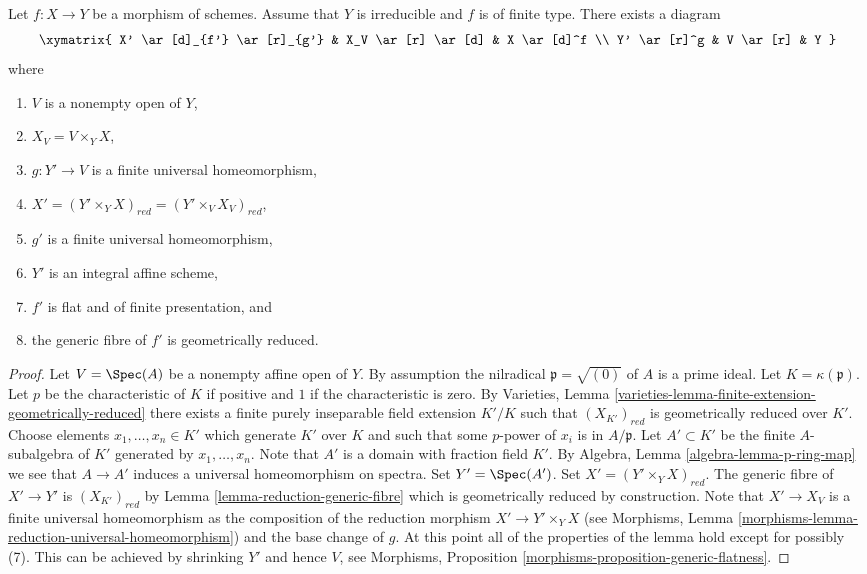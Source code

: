 \begin{lemma}
\label{lemma-make-generic-fibre-geometrically-reduced}
Let $f : X \to Y$ be a morphism of schemes.
Assume that $Y$ is irreducible and $f$ is of finite type.
There exists a diagram
$$
\xymatrix{
X' \ar[d]_{f'} \ar[r]_{g'} & X_V \ar[r] \ar[d] & X \ar[d]^f \\
Y' \ar[r]^g & V \ar[r] & Y
}
$$
where
\begin{enumerate}
\item $V$ is a nonempty open of $Y$,
\item $X_V = V \times_Y X$,
\item $g : Y' \to V$ is a finite universal homeomorphism,
\item $X' = (Y' \times_Y X)_{red} = (Y' \times_V X_V)_{red}$,
\item $g'$ is a finite universal homeomorphism,
\item $Y'$ is an integral affine scheme,
\item $f'$ is flat and of finite presentation, and
\item the generic fibre of $f'$ is geometrically reduced.
\end{enumerate}
\end{lemma}

\begin{proof}
Let $V = \Spec(A)$ be a nonempty affine open of $Y$.
By assumption the nilradical $\mathfrak p = \sqrt{(0)}$ of $A$
is a prime ideal.
Let $K = \kappa(\mathfrak p)$.
Let $p$ be the characteristic of $K$ if positive and $1$
if the characteristic is zero. By
Varieties, Lemma \ref{varieties-lemma-finite-extension-geometrically-reduced}
there exists a finite purely inseparable field extension
$K'/K$ such that $(X_{K'})_{red}$ is geometrically reduced over $K'$.
Choose elements $x_1, \ldots, x_n \in K'$ which generate $K'$ over
$K$ and such that some $p$-power of $x_i$ is in $A/\mathfrak p$.
Let $A' \subset K'$ be the finite $A$-subalgebra of $K'$ generated by
$x_1, \ldots, x_n$. Note that $A'$ is a domain with fraction field $K'$. By
Algebra, Lemma \ref{algebra-lemma-p-ring-map}
we see that $A \to A'$ induces a universal homeomorphism on spectra.
Set $Y' = \Spec(A')$. Set $X' = (Y' \times_Y X)_{red}$.
The generic fibre of $X' \to Y'$ is $(X_{K'})_{red}$ by
Lemma \ref{lemma-reduction-generic-fibre}
which is geometrically reduced by construction.
Note that $X' \to X_V$ is a finite universal homeomorphism as the
composition of the reduction morphism $X' \to Y' \times_Y X$ (see
Morphisms, Lemma \ref{morphisms-lemma-reduction-universal-homeomorphism})
and the base change of $g$.
At this point all of the properties of the lemma hold except for
possibly (7). This can be achieved by shrinking $Y'$ and hence $V$, see
Morphisms, Proposition \ref{morphisms-proposition-generic-flatness}.
\end{proof}

